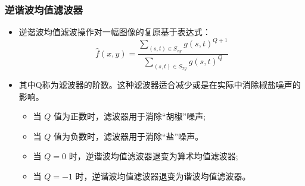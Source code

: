 \documentclass{beamer}
\begin{document}
\begin{frame}
\frametitle{逆谐波均值滤波器}
\label{sec-5-5}

\begin{itemize}
\item 逆谐波均值滤波操作对一幅图像的复原基于表达式：
     \[ \hat f(x,y) = \frac{\sum_{(s,t)\in S_{xy}}g(s,t)^{Q+1}}{\sum_{(s,t)\in S_{xy}}g(s,t)^Q} \]
\item 其中Q称为滤波器的阶数。这种滤波器适合减少或是在实际中消除椒盐噪声的影响。
\begin{itemize}
\item 当 $Q$ 值为正数时，滤波器用于消除“胡椒”噪声;
\item 当 $Q$ 值为负数时，滤波器用于消除“盐”噪声。
\item 当 $Q=0$ 时，逆谐波均值滤波器退变为算术均值滤波器;
\item 当 $Q=-1$ 时，逆谐波均值滤波器退变为谐波均值滤波器。
\end{itemize}
\end{itemize}
\end{frame}
\end{document}
